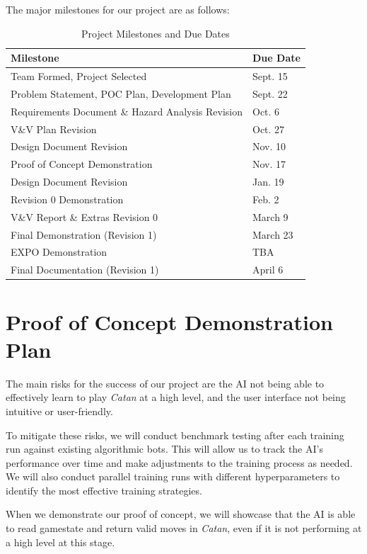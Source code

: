 \documentclass{article}
\begin{document}
\medskip
The major milestones for our project are as follows:
\begin{table}[h!]
  \centering
  \begin{tabular}{|l|l|}
  \hline
  \textbf{Milestone} & \textbf{Due Date} \\ \hline
  Team Formed, Project Selected & Sept. 15 \\ \hline
  Problem Statement, POC Plan, Development Plan & Sept. 22 \\ \hline
  Requirements Document \& Hazard Analysis Revision & Oct. 6 \\ \hline
  V\&V Plan Revision & Oct. 27 \\ \hline
  Design Document Revision & Nov. 10 \\ \hline
  Proof of Concept Demonstration & Nov. 17 \\ \hline
  Design Document Revision & Jan. 19 \\ \hline
  Revision 0 Demonstration & Feb. 2 \\ \hline
  V\&V Report \& Extras Revision 0 & March 9 \\ \hline
  Final Demonstration (Revision 1) & March 23 \\ \hline
  EXPO Demonstration & TBA \\ \hline
  Final Documentation (Revision 1) & April 6 \\ \hline
  
  \end{tabular}
  \caption{Project Milestones and Due Dates}
  \label{tab:project-milestones}
  \end{table}


\section{Proof of Concept Demonstration Plan}

\raggedright
The main risks for the success of our project are the AI not 
being able to effectively learn to play \emph{Catan} at a high level, 
and the user interface not being intuitive or user-friendly. 

To mitigate these risks, we will conduct benchmark testing
after each training run against existing algorithmic bots.
This will allow us to track the AI's performance over time and
make adjustments to the training process as needed.
We will also conduct parallel training runs with different
hyperparameters to identify the most effective training 
strategies.

When we demonstrate our proof of concept,
we will showcase that the AI is able to read gamestate and return valid moves
in \emph{Catan}, even if it is not performing at a high level at this stage. 
\end{document}

